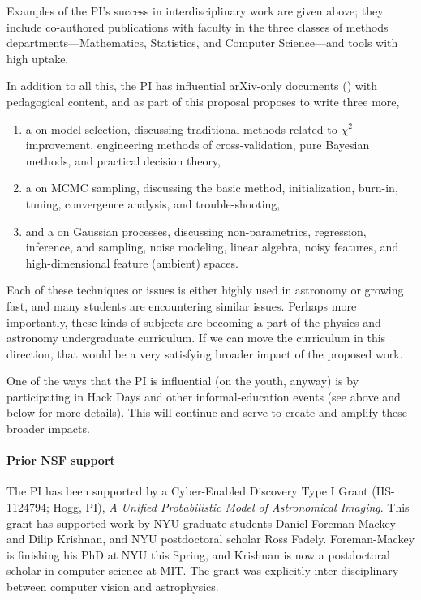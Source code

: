 \documentclass[12pt]{article}
\begin{document}
Examples of the PI's success in interdisciplinary work are given
above; they include co-authored publications with faculty in the three
classes of methods departments---Mathematics, Statistics, and Computer
Science---and tools with high uptake.

In addition to all this, the PI has influential arXiv-only documents
() with pedagogical content, and as
part of this proposal proposes to write three more,
\begin{enumerate}
\item
a  on model selection, discussing
traditional methods related to $\chi^2$ improvement, engineering
methods of cross-validation, pure Bayesian methods, and practical
decision theory,
\item
a  on MCMC sampling, discussing the
basic method, initialization, burn-in, tuning, convergence analysis,
and trouble-shooting,
\item
and a  on Gaussian processes,
discussing non-parametrics, regression, inference, and sampling, noise
modeling, linear algebra, noisy features, and high-dimensional feature
(ambient) spaces.
\end{enumerate}
Each of these techniques or issues is either highly used in astronomy
or growing fast, and many students are encountering similar issues.
Perhaps more importantly, these kinds of subjects are becoming a part
of the physics and astronomy undergraduate curriculum.
If we can move the curriculum in this direction, that would be a very
satisfying broader impact of the proposed work.

One of the ways that the PI is influential (on the youth, anyway) is
by participating in Hack Days and other informal-education events (see
above and below for more details).  This will continue and serve to
create and amplify these broader impacts.

\paragraph{Prior NSF support}

The PI has been supported by a Cyber-Enabled Discovery Type I Grant
(IIS-1124794; Hogg, PI), \textit{A Unified Probabilistic Model of
  Astronomical Imaging}.
This grant has supported work by NYU graduate students Daniel
Foreman-Mackey and Dilip Krishnan, and NYU postdoctoral scholar Ross
Fadely.
Foreman-Mackey is finishing his PhD at NYU this Spring, and Krishnan
is now a postdoctoral scholar in computer science at MIT.
The grant was explicitly inter-disciplinary between computer vision
and astrophysics.
\end{document}
